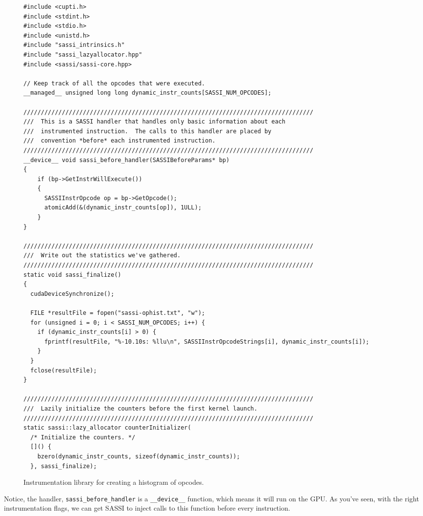 \begin{figure*}[h!]
\begin{lstlisting}
#include <cupti.h>
#include <stdint.h>
#include <stdio.h>
#include <unistd.h>
#include "sassi_intrinsics.h"
#include "sassi_lazyallocator.hpp"
#include <sassi/sassi-core.hpp>

// Keep track of all the opcodes that were executed.
__managed__ unsigned long long dynamic_instr_counts[SASSI_NUM_OPCODES];

///////////////////////////////////////////////////////////////////////////////////
///  This is a SASSI handler that handles only basic information about each
///  instrumented instruction.  The calls to this handler are placed by
///  convention *before* each instrumented instruction.
///////////////////////////////////////////////////////////////////////////////////
__device__ void sassi_before_handler(SASSIBeforeParams* bp)
{
    if (bp->GetInstrWillExecute())
    {
      SASSIInstrOpcode op = bp->GetOpcode();
      atomicAdd(&(dynamic_instr_counts[op]), 1ULL);
    }
}

///////////////////////////////////////////////////////////////////////////////////
///  Write out the statistics we've gathered.
///////////////////////////////////////////////////////////////////////////////////
static void sassi_finalize()
{
  cudaDeviceSynchronize();

  FILE *resultFile = fopen("sassi-ophist.txt", "w");
  for (unsigned i = 0; i < SASSI_NUM_OPCODES; i++) {
    if (dynamic_instr_counts[i] > 0) {
      fprintf(resultFile, "%-10.10s: %llu\n", SASSIInstrOpcodeStrings[i], dynamic_instr_counts[i]);
    }
  }
  fclose(resultFile);
}

///////////////////////////////////////////////////////////////////////////////////
///  Lazily initialize the counters before the first kernel launch. 
///////////////////////////////////////////////////////////////////////////////////
static sassi::lazy_allocator counterInitializer(
  /* Initialize the counters. */
  []() {
    bzero(dynamic_instr_counts, sizeof(dynamic_instr_counts));
  }, sassi_finalize);
\end{lstlisting}
\caption{Instrumentation library for creating a histogram of opcodes.}
\label{fig:handler-example1}
\end{figure*}

Notice, the handler, \texttt{sassi\_before\_handler} is a
\texttt{\_\_device\_\_} function, which means it will run on the GPU.
As you've seen, with the right instrumentation flags, we can get SASSI
to inject calls to this function before every instruction.

